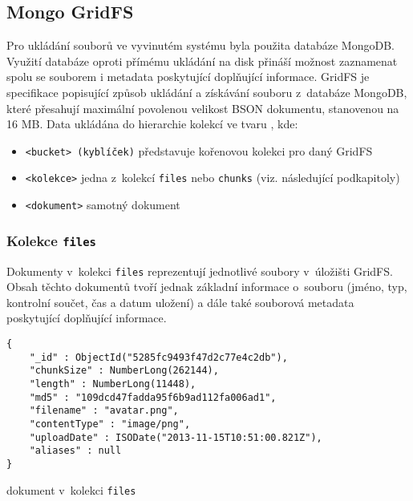 \subsection{Mongo GridFS}
Pro ukládání souborů ve vyvinutém systému byla použita databáze MongoDB. Využití databáze oproti přímému ukládání na disk přináší možnost zaznamenat spolu se souborem i metadata poskytující doplňující informace. GridFS je specifikace popisující způsob ukládání a získávání souboru z~databáze MongoDB, které přesahují maximální povolenou velikost BSON dokumentu, stanovenou na 16 MB\cite{mongo-documentation}. Data  ukládána do hierarchie kolekcí ve tvaru , kde:
\begin{itemize}
\item \texttt{<bucket> (kyblíček)} představuje kořenovou kolekci pro daný GridFS
\item \texttt{<kolekce>} jedna z~kolekcí \texttt{files} nebo \texttt{chunks} (viz. následující podkapitoly)
\item \texttt{<dokument>} samotný dokument
\end{itemize}

\subsubsection{\textbf{Kolekce \texttt{files}}}
Dokumenty v~kolekci \texttt{files} reprezentují jednotlivé soubory v~úložišti GridFS. Obsah těchto dokumentů tvoří jednak základní informace o~souboru (jméno, typ, kontrolní součet, čas a datum uložení) a dále také souborová metadata poskytující doplňující informace.
\begin{example}
\centering
\begin{lstlisting}
{
    "_id" : ObjectId("5285fc9493f47d2c77e4c2db"),
    "chunkSize" : NumberLong(262144),
    "length" : NumberLong(11448),
    "md5" : "109dcd47fadda95f6b9ad112fa006ad1",
    "filename" : "avatar.png",
    "contentType" : "image/png",
    "uploadDate" : ISODate("2013-11-15T10:51:00.821Z"),
    "aliases" : null
}
\end{lstlisting}
\caption{dokument v~kolekci \texttt{files}}
\end{example}

